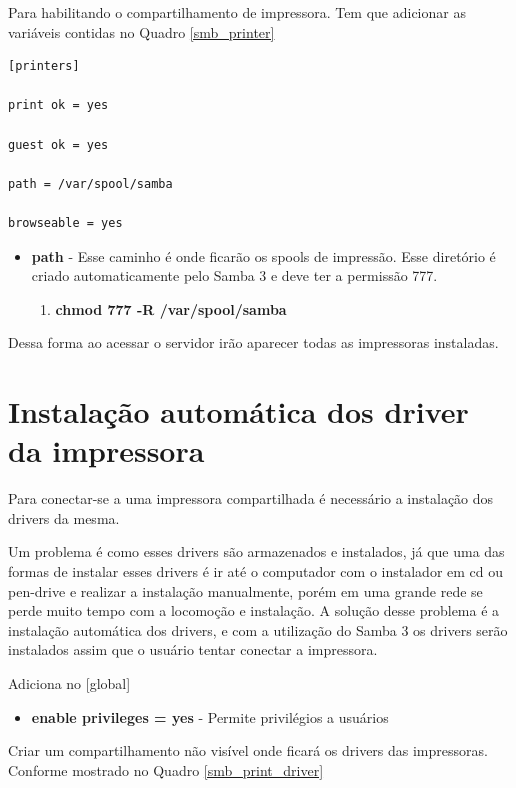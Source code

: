 Para habilitando o compartilhamento de impressora. Tem que adicionar as variáveis contidas no Quadro \ref{smb_printer}\\

\begin{lstlisting}[caption=Variáveis para compartilhar impressoras,label={smb_printer}]	
[printers]

print ok = yes

guest ok = yes

path = /var/spool/samba

browseable = yes	
\end{lstlisting}

\begin{itemize}
	\item \textbf{path} - Esse caminho é onde ficarão os spools de impressão. Esse diretório é criado automaticamente pelo Samba 3 e deve ter a permissão 777.
	\begin{enumerate}
		\item \textbf{chmod 777 -R /var/spool/samba}
	\end{enumerate}
\end{itemize}

Dessa forma ao acessar o servidor irão aparecer todas as impressoras instaladas.

\section{Instalação automática dos driver da impressora}

Para conectar-se a uma impressora compartilhada é necessário a instalação dos drivers da mesma. 

Um problema é como esses drivers são armazenados e instalados, já que uma das formas de instalar esses drivers é ir até o computador com o instalador em cd ou pen-drive e realizar a instalação manualmente, porém em uma grande rede se perde muito tempo com a locomoção e instalação. A solução desse problema é a instalação automática dos drivers, e com a utilização do Samba 3 os drivers serão instalados assim que o usuário tentar conectar a impressora.

Adiciona no [global]

\begin{itemize}
	\item \textbf{enable privileges = yes} - Permite privilégios a usuários
\end{itemize}

Criar um compartilhamento não visível onde ficará os drivers das impressoras. Conforme mostrado no Quadro \ref{smb_print_driver}\\

